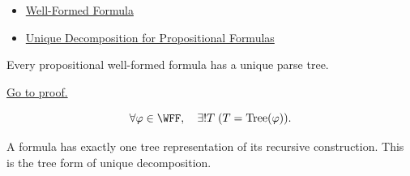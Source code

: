 \begin{dependencies}
\begin{itemize}
  \item \hyperref[def:well-formed-formula]{Well-Formed Formula}
  \item \hyperref[thm:unique-decomposition-propositional-formulas]{Unique Decomposition for Propositional Formulas}
\end{itemize}
\end{dependencies}
\begin{tcolorbox}[colback=thmbox, colframe=thmborder, arc=2pt,
  left=6pt, right=6pt, top=4pt, bottom=4pt,
  title={\small\textbf{Theorem (Unique Syntax Tree for Propositional Formulas)}},
  fonttitle=\small\bfseries]
\begin{theorem}
\label{thm:unique-syntax-tree-propositional-formulas}
Every propositional well-formed formula has a unique parse tree.

\noindent\hyperref[prf:unique-syntax-tree-propositional-formulas]{Go to proof.}
\end{theorem}
\end{tcolorbox}

\begin{remark*}
\[
\forall\varphi\in\WFF,\quad \exists!T\; (T=\operatorname{Tree}(\varphi)).
\]
\end{remark*}

\begin{remark*}[Interpretation]
A formula has exactly one tree representation of its recursive construction. This is the tree form of unique decomposition.
\end{remark*}

